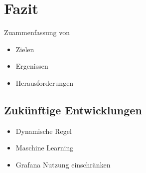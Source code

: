\section{Fazit}

Zuammenfassung von

\begin{itemize}[noitemsep]
    \item Zielen
    \item Ergenissen
    \item Herausforderungen
 \end{itemize}
 
\subsection{Zukünftige Entwicklungen}

\begin{itemize}[noitemsep]
    \item Dynamische Regel
    \item Maschine Learning
    \item Grafana Nutzung einschränken
 \end{itemize}
 
